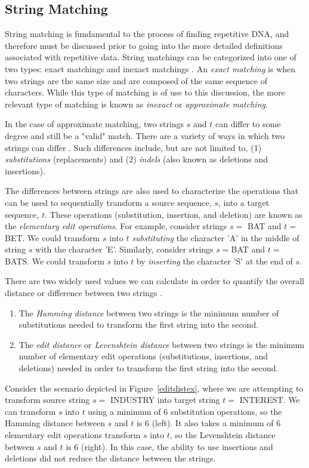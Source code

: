 \subsection{String Matching}
String matching is fundamental to the process of finding repetitive DNA, and therefore must be discussed prior to  going into the more detailed definitions associated with repetitive data. String matchings can be categorized into one of two types: exact matchings and inexact matchings \cite{gusfield1997algorithms}. An \textit{exact matching} is when two strings are the same size and are composed of the same sequence of characters. While this type of matching is of use to this discussion, the more relevant type of matching is known as \textit{inexact} or \textit{approximate matching}. 

In the case of approximate matching, two strings $s$ and $t$ can differ to some degree and still be a "valid" match. There are a variety of ways in which two strings can differ \cite{kruskal1983an-overview}. Such differences include, but are not limited to, (1) \textit{substitutions} (replacements) and (2) \textit{indels} (also known as deletions and insertions). 

The differences between strings are also used to characterize the operations that can be used to sequentially transform a source sequence, $s$, into a target sequence, $t$. These operations (substitution, insertion, and deletion) are known as the \textit{elementary edit operations}. For example, consider strings $s=$ BAT and $t=$ BET. We could transform $s$ into $t$ \textit{substituting} the character 'A' in the middle of string $s$ with the character 'E'. Similarly, consider strings $s=$BAT and $t=$BATS. We could transform $s$ into $t$ by \textit{inserting} the character 'S' at the end of $s$.

 There are two widely used values we can calculate in order to quantify the overall distance or difference between two strings \cite{kruskal1983an-overview}. 
 \begin{enumerate}
 \item{The \textit{Hamming distance} between two strings is the minimum number of substitutions needed to transform the first string into the second.}
 \item{The \textit{edit distance} or \textit{Levenshtein distance} \cite{levenshtein1966binary} between two strings is the minimum number of elementary edit operations (substitutions, insertions, and deletions) needed in order to transform the first string into the second.}
 \end{enumerate}
Consider the scenario depicted in Figure~\ref{editdistex}, where we are attempting to transform source string $s=$ INDUSTRY into target string $t=$ INTEREST. We can transform $s$ into $t$ using a minimum of 6 substitution operations, so the Hamming distance between $s$ and $t$ is 6 (left). It also takes a minimum of 6 elementary edit operations  transform $s$ into $t$, so the Levenshtein distance between $s$ and $t$ is 6 (right). In this case, the ability to use insertions and deletions did not reduce the distance between the strings.

